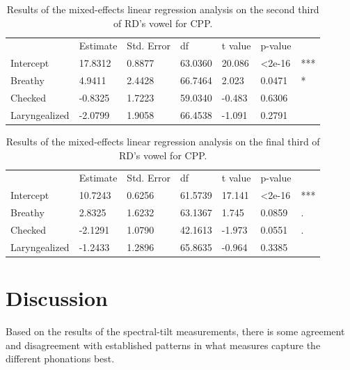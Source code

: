 \documentclass[12pt, letterpaper]{article}
\providecommand{\lsptoprule}{\midrule\toprule}
\providecommand{\lspbottomrule}{\bottomrule\midrule}
\begin{document}
\begin{table}[!h]
    \centering
    \caption{Results of the mixed-effects linear regression analysis on the second third of RD's vowel for CPP. }
    \label{tab:RD_CPP_Second}
    \begin{tabular}{lllllll}
	\lsptoprule
					&  Estimate  & Std. Error & df & t value & p-value & \\
        Intercept       & 17.8312 & 0.8877 & 63.0360 & 20.086 & <2e-16 & *** \\  
  	Breathy   		&  4.9411 & 2.4428 & 66.7464 & 2.023 & 0.0471 & * \\
	Checked    		&  -0.8325 & 1.7223 & 59.0340 & -0.483 & 0.6306 & \\
	Laryngealized	& -2.0799 & 1.9058 & 66.4538 & -1.091 &  0.2791 & \\
        \lspbottomrule
    \end{tabular}
\end{table}

\begin{table}[!h]
    \centering
    \caption{Results of the mixed-effects linear regression analysis on the final third of RD's vowel for CPP. }
    \label{tab:RD_CPP_Third}
    \begin{tabular}{lllllll}
	\lsptoprule
					&  Estimate  & Std. Error & df & t value & p-value & \\
        Intercept       & 10.7243 & 0.6256 & 61.5739 & 17.141 & <2e-16 & *** \\  
  	Breathy   		& 2.8325  & 1.6232 & 63.1367 &  1.745 &  0.0859 & .\\
	Checked    		& -2.1291 & 1.0790 & 42.1613 & -1.973 &  0.0551 & . \\
	Laryngealized	& -1.2433 & 1.2896 & 65.8635 & -0.964 &  0.3385 &  \\
        \lspbottomrule
    \end{tabular}
\end{table}

\section{Discussion} \label{sec:Discussion}

Based on the results of the spectral-tilt measurements, there is some agreement and disagreement with established patterns in what measures capture the different phonations best. 
\end{document}
